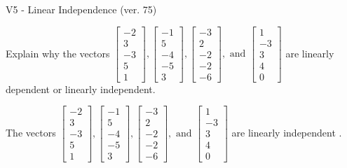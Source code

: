 \begin{exercise}
  \begin{exerciseTitle}V5 - Linear Independence (ver. 75)\end{exerciseTitle}
  \begin{exerciseStatement}
    Explain why the vectors \(\left[\begin{array}{r}
-2 \\
3 \\
-3 \\
5 \\
1
\end{array}\right] , \left[\begin{array}{r}
-1 \\
5 \\
-4 \\
-5 \\
3
\end{array}\right] , \left[\begin{array}{r}
-3 \\
2 \\
-2 \\
-2 \\
-6
\end{array}\right] , \text{ and } \left[\begin{array}{r}
1 \\
-3 \\
3 \\
4 \\
0
\end{array}\right]\) are linearly dependent or linearly independent.	


  \end{exerciseStatement}
  \begin{exerciseAnswer}
   The vectors \(\left[\begin{array}{r}
-2 \\
3 \\
-3 \\
5 \\
1
\end{array}\right] , \left[\begin{array}{r}
-1 \\
5 \\
-4 \\
-5 \\
3
\end{array}\right] , \left[\begin{array}{r}
-3 \\
2 \\
-2 \\
-2 \\
-6
\end{array}\right] , \text{ and } \left[\begin{array}{r}
1 \\
-3 \\
3 \\
4 \\
0
\end{array}\right]\) are 
  	 linearly independent  .
  


  \end{exerciseAnswer}
\end{exercise}